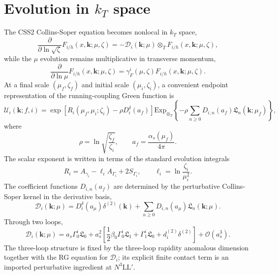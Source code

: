 \documentclass[aps,prd,preprint,superscriptaddress,nofootinbib,longbibliography]{revtex4-2}
\newcommand{\bk}{\bm k}
\newcommand{\ot}{\otimes_T}
\newcommand{\deltaT}{\delta^{(2)}}
\newcommand{\ExpT}{\mathrm{Exp}_{\otimes_T}}
\newcommand{\NthreeLLp}{N^3\mathrm{LL}'}
\newcommand{\order}[1]{\mathcal O\!\left(#1\right)}
\begin{document}
\section{Evolution in $k_T$ space}

The CSS2 Collins-Soper equation becomes nonlocal in $k_T$ space,
\begin{equation}
  \frac{\partial}{\partial\ln\sqrt\zeta}
  F_{i/h}(x,\bk;\mu,\zeta)
  =-\mathcal D_i(\bk;\mu)\ot F_{i/h}(x,\bk;\mu,\zeta),
  \label{eq:cs-k-space}
\end{equation}
while the $\mu$ evolution remains multiplicative in transverse momentum,
\begin{equation}
  \frac{\partial}{\partial\ln\mu}
  F_{i/h}(x,\bk;\mu,\zeta)
  =\gamma_F^i(\mu,\zeta)F_{i/h}(x,\bk;\mu,\zeta).
\end{equation}
At a final scale $(\mu_f,\zeta_f)$ and initial scale $(\mu_i,\zeta_i)$, a convenient endpoint representation of the running-coupling Green function is
\begin{equation}
  \mathcal U_i(\bk;f,i)
  =\exp\!\left[R_i(\mu_f,\mu_i;\zeta_i)-\rho D_i^\delta(a_f)\right]
  \ExpT\!\left\{-\rho\sum_{n\ge0}D_{i,n}(a_f)\mathfrak L_n(\bk;\mu_f)\right\},
  \label{eq:running-U}
\end{equation}
where
\begin{equation}
  \rho=\ln\sqrt{\frac{\zeta_f}{\zeta_i}},\qquad a_f=\frac{\alpha_s(\mu_f)}{4\pi}.
\end{equation}
The scalar exponent is written in terms of the standard evolution integrals
\begin{equation}
  R_i=A_{\gamma_i}-\ell_i A_{\Gamma_i}+2S_{\Gamma_i},
  \qquad
  \ell_i=\ln\frac{\zeta_i}{\mu_i^2}.
\end{equation}
The coefficient functions $D_{i,n}(a_f)$ are determined by the perturbative Collins-Soper kernel in the derivative basis,
\begin{equation}
  \mathcal D_i(\bk;\mu)
  =D_i^\delta(a_\mu)\deltaT(\bk)+\sum_{n\ge0}D_{i,n}(a_\mu)\mathfrak L_n(\bk;\mu).
\end{equation}
Through two loops,
\begin{equation}
  \mathcal D_i(\bk;\mu)
  =a_s\Gamma_0^i\mathfrak L_0
  +a_s^2\left[\frac{1}{2}\beta_0\Gamma_0^i\mathfrak L_1+
  \Gamma_1^i\mathfrak L_0+d_i^{(2)}\deltaT\right]+
  \order{a_s^3}.
\end{equation}
The three-loop structure is fixed by the three-loop rapidity anomalous dimension together with the RG equation for $\mathcal D_i$; its explicit finite contact term is an imported perturbative ingredient at $\NthreeLLp$.
\end{document}
